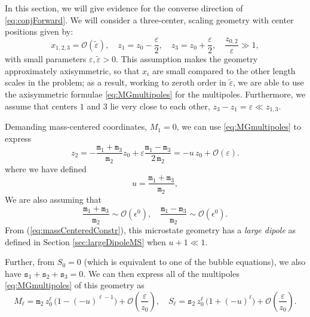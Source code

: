 \documentclass[12pt,a4paper]{article}
\newcommand{\mm}{\mathtt{m}}
\newcommand{\sm}{\mathtt{s}}
\begin{document}
In this section, we will give evidence for the converse direction of \eqref{eq:conjForward}. We will consider a three-center, scaling geometry with center positions given by:
\begin{equation}
x_{1,2,3}=\mathcal{O}(\tilde\varepsilon),\quad z_1=z_0-\frac{\varepsilon}{2},\quad z_3=z_0+\frac{\varepsilon}{2},\quad\frac{z_{0,2}}{\varepsilon}\gg 1,\label{eq:2centreApprox}
\end{equation}
with small parameters $\varepsilon,\tilde\varepsilon>0$.
This assumption makes the geometry approximately axisymmetric, so that $x_i$ are small compared to the other length scales in the problem; as a result, working to zeroth order in $\tilde\varepsilon$, we are able to use the axisymmetric formulae \eqref{eq:MGmultipoles} for the multipoles.
%
Furthermore, we assume that centers $1$ and $3$ lie very close to each other, $z_3-z_1=\varepsilon\ll z_{1,3}$.

Demanding mass-centered coordinates, $M_1=0$, we can use \eqref{eq:MGmultipoles} to express
\begin{equation}
z_2=-\frac{\mm_1+\mm_3}{\mm_2}z_0+\varepsilon\frac{\mm_1-\mm_3}{2\,\mm_2} = -u\,z_0 + \mathcal{O}(\varepsilon).\label{eq:massCenteredConstr}
\end{equation}
where we have defined
\begin{equation}
u=\frac{\mm_1+\mm_3}{\mm_2},\label{eq:uSub}
\end{equation}
We are also assuming that
\begin{equation}\label{eq:assmp1}
\frac{\mm_1+\mm_3}{\mm_2}\sim\mathcal{O}(\epsilon^0),\quad \frac{\mm_1-\mm_3}{\mm_2}\sim\mathcal{O}(\epsilon^0).
\end{equation}
From (\ref{eq:massCenteredConstr}), this microstate geometry has a \emph{large dipole} as defined in Section \ref{sec:largeDipoleMS} when $u+1\ll 1$.

Further, from $S_0=0$ (which is equivalent to one of the bubble equations), we also have $\sm_1+\sm_2+\sm_3=0$. We can then express all of the multipoles \eqref{eq:MGmultipoles} of this geometry as
\begin{equation}
M_\ell=\mm_2\,z_0^\ell\,\Big(1-(-u)^{\ell-1}\Big)+\mathcal{O}(\frac{\varepsilon}{z_0}),\quad S_\ell=\sm_2\,z_0^\ell\,\Big(1+(-u)^\ell\Big)+ \mathcal{O}(\frac{\varepsilon}{z_0}).
\end{equation}
\end{document}
